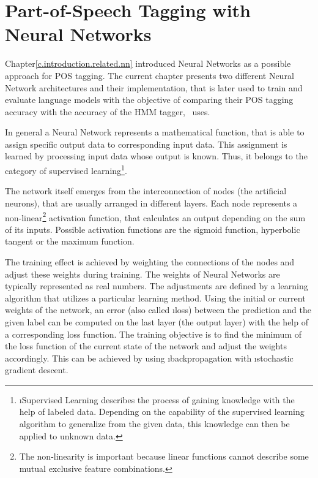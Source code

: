 \chapter{Part-of-Speech Tagging with Neural Networks}\label{c.postagging}
Chapter\ref{c.introduction.related.nn} introduced Neural Networks as a possible approach for POS tagging. The current chapter presents two different Neural Network architectures and their implementation, that is later used to train and evaluate language models with the objective of comparing their POS tagging accuracy with the accuracy of the HMM tagger, \Alex\ uses.

In general a Neural Network represents a mathematical function, that is able to assign specific output data to corresponding input data. This assignment is learned by processing input data whose output is known. Thus, it belongs to the category of supervised learning\footnote{\i{Supervised Learning} describes the process of gaining knowledge with the help of labeled data. Depending on the capability of the supervised learning algorithm to generalize from the given data, this knowledge can then be applied to unknown data.}.

The network itself emerges from the interconnection of nodes (the artificial neurons), that are usually arranged in different layers. Each node represents a non-linear\footnote{The non-linearity is important because linear functions cannot describe some mutual exclusive feature combinations.} activation function, that calculates an output depending on the sum of its inputs. Possible activation functions are the sigmoid function, hyperbolic tangent or the maximum function.

The training effect is achieved by weighting the connections of the nodes and adjust these weights during training. The weights of Neural Networks are typically represented as real numbers. The adjustments are defined by a learning algorithm that utilizes a particular learning method. Using the initial or current weights of the network, an error (also called \i{loss}) between the prediction and the given label can be computed on the last layer (the output layer) with the help of a corresponding loss function. The training objective is to find the minimum of the loss function of the current state of the network and adjust the weights accordingly. This can be achieved by using \i{backpropagation} with \i{stochastic gradient descent}.

